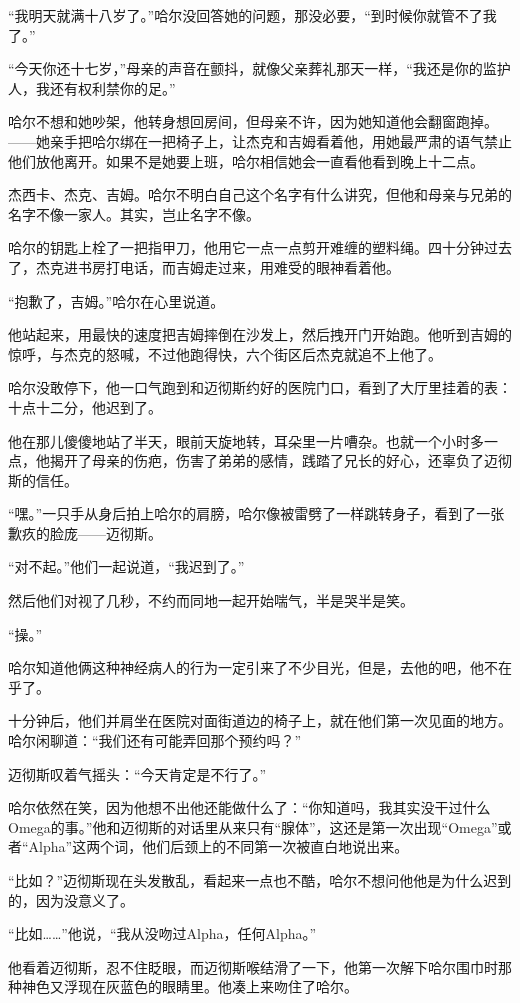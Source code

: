 \documentclass[../main]{subfiles}
\begin{document}
“我明天就满十八岁了。”哈尔没回答她的问题，那没必要，“到时候你就管不了我了。”

“今天你还十七岁，”母亲的声音在颤抖，就像父亲葬礼那天一样，“我还是你的监护人，我还有权利禁你的足。”

哈尔不想和她吵架，他转身想回房间，但母亲不许，因为她知道他会翻窗跑掉。——她亲手把哈尔绑在一把椅子上，让杰克和吉姆看着他，用她最严肃的语气禁止他们放他离开。如果不是她要上班，哈尔相信她会一直看他看到晚上十二点。

杰西卡、杰克、吉姆。哈尔不明白自己这个名字有什么讲究，但他和母亲与兄弟的名字不像一家人。其实，岂止名字不像。

哈尔的钥匙上栓了一把指甲刀，他用它一点一点剪开难缠的塑料绳。四十分钟过去了，杰克进书房打电话，而吉姆走过来，用难受的眼神看着他。

“抱歉了，吉姆。”哈尔在心里说道。

他站起来，用最快的速度把吉姆摔倒在沙发上，然后拽开门开始跑。他听到吉姆的惊呼，与杰克的怒喊，不过他跑得快，六个街区后杰克就追不上他了。

哈尔没敢停下，他一口气跑到和迈彻斯约好的医院门口，看到了大厅里挂着的表：十点十二分，他迟到了。

他在那儿傻傻地站了半天，眼前天旋地转，耳朵里一片嘈杂。也就一个小时多一点，他揭开了母亲的伤疤，伤害了弟弟的感情，践踏了兄长的好心，还辜负了迈彻斯的信任。

“嘿。”一只手从身后拍上哈尔的肩膀，哈尔像被雷劈了一样跳转身子，看到了一张歉疚的脸庞——迈彻斯。

“对不起。”他们一起说道，“我迟到了。”

然后他们对视了几秒，不约而同地一起开始喘气，半是哭半是笑。

“操。”

哈尔知道他俩这种神经病人的行为一定引来了不少目光，但是，去他的吧，他不在乎了。

十分钟后，他们并肩坐在医院对面街道边的椅子上，就在他们第一次见面的地方。哈尔闲聊道：“我们还有可能弄回那个预约吗？”

迈彻斯叹着气摇头：“今天肯定是不行了。”

哈尔依然在笑，因为他想不出他还能做什么了：“你知道吗，我其实没干过什么Omega的事。”他和迈彻斯的对话里从来只有“腺体”，这还是第一次出现“Omega”或者“Alpha”这两个词，他们后颈上的不同第一次被直白地说出来。

“比如？”迈彻斯现在头发散乱，看起来一点也不酷，哈尔不想问他他是为什么迟到的，因为没意义了。

“比如\ldots\ldots”他说，“我从没吻过Alpha，任何Alpha。”

他看着迈彻斯，忍不住眨眼，而迈彻斯喉结滑了一下，他第一次解下哈尔围巾时那种神色又浮现在灰蓝色的眼睛里。他凑上来吻住了哈尔。
\end{document}
